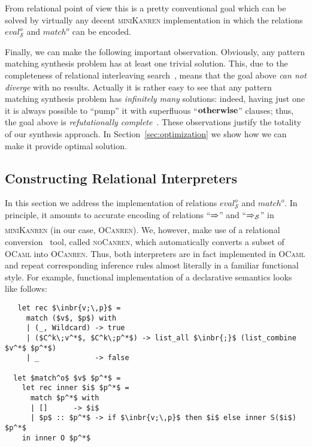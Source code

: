 From relational point of view this is a pretty conventional goal which can be solved by virtually any decent \textsc{miniKanren} implementation in
which the relations $eval^o_{\mathcal S}$ and $match^o$ can be encoded.

Finally, we can make the following important observation. Obviously, any pattern matching synthesis problem has at least one trivial solution.
This, due to the completeness of relational interleaving search~\cite{search,certifiedSemantics}, means that the goal above \emph{can not diverge} with
no results. Actually it is rather easy to see that any pattern matching synthesis problem has \emph{infinitely many} solutions: indeed, having just
one it is always possible to ``pump'' it with superfluous ``$\mathbf{otherwise}$'' clauses; thus, the goal above is \emph{refutationally
complete}~\cite{WillThesis,DivergenceTest}. These observations justify the totality of our synthesis approach. In Section~\ref{sec:optimization} we show
how we can make it provide optimal solution.

\subsection{Constructing Relational Interpreters}
\label{sec:relints}

In this section we address the implementation of relations $eval^o_{\mathcal S}$ and $match^o$. In principle, it amounts to accurate encoding of
relations 
``$\xRightarrow{}{}\!\!$'' and ``$\xRightarrow{}{}_{\!\!\mathcal S}$'' 
in \textsc{miniKanren} (in our case, \textsc{OCanren}). We, however,
make use of a relational conversion~\cite{conversion} tool, called \textsc{noCanren}, which automatically converts a subset of \textsc{OCaml} into
\textsc{OCanren}. Thus, both interpreters are in fact implemented in \textsc{OCaml} and repeat corresponding inference rules almost
literally in a familiar functional style. For example, functional implementation of a declarative semantics looks like follows:

\begin{lstlisting}
   let rec $\inbr{v;\,p}$ =
     match ($v$, $p$) with
     | (_, Wildcard) -> true
     | ($C^k\;v^*$, $C^k\;p^*$) -> list_all $\inbr{;}$ (list_combine $v^*$ $p^*$)
     | _             -> false

  let $match^o$ $v$ $p^*$ =
    let rec inner $i$ $p^*$ =
      match $p^*$ with
      | []      -> $i$
      | $p$ :: $p^*$ -> if $\inbr{v;\,p}$ then $i$ else inner S($i$) $p^*$
    in inner O $p^*$
\end{lstlisting}

